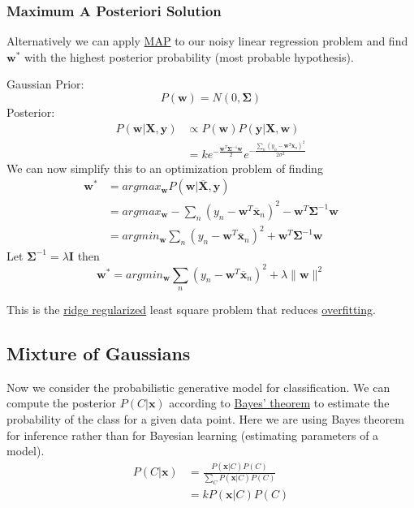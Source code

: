 \documentclass[12pt]{article}
\begin{document}
        \subsubsection{Maximum A Posteriori Solution}
            Alternatively we can apply \hyperref[sec:MAP]{MAP} to our noisy linear regression problem and find
            $\boldsymbol{w}^*$ with the highest posterior probability (most probable hypothesis).
            
            Gaussian Prior:
            $$ P(\boldsymbol{w}) = N(0, \boldsymbol{\Sigma}) $$ Posterior:
            \begin{align*}
                P(\boldsymbol{w} | \boldsymbol{X}, \boldsymbol{y}) &\propto P(\boldsymbol{w})P(\boldsymbol{y}|\boldsymbol{X}, \boldsymbol{w}) \\
                &= ke^{-\frac{\boldsymbol{w}^T\boldsymbol{\Sigma}^{-1}\boldsymbol{w}}{2}} e^{-\frac{\sum_n(y_n - \boldsymbol{w}^T\boldsymbol{x}_n)^2}{2\sigma^2}}
            \end{align*}
            We can now simplify this to an optimization problem of finding
            \begin{align*}
                \boldsymbol{w}^* &= argmax_{\boldsymbol{w}}P(\boldsymbol{w}|\overline{\boldsymbol{X}}, \boldsymbol{y}) \\
                &= argmax_{\boldsymbol{w}} - \sum_{n} (y_n - \boldsymbol{w}^T\overline{\boldsymbol{x}}_n)^2 - \boldsymbol{w}^T \boldsymbol{\Sigma}^{-1}\boldsymbol{w} \\
                &= argmin_{\boldsymbol{w}} \sum_{n} (y_n - \boldsymbol{w}^T \overline{\boldsymbol{x}}_n)^2 + \boldsymbol{w}^T \boldsymbol{\Sigma}^{-1}\boldsymbol{w}
            \end{align*}
            Let $\boldsymbol{\Sigma}^{-1} = \lambda \boldsymbol{I}$ then
            $$ \boldsymbol{w}^* = argmin_{\boldsymbol{w}} \sum_{n} (y_n - \boldsymbol{w}^T
            \overline{\boldsymbol{x}}_n)^2 + \lambda \|\boldsymbol{w}\|^2 $$

            This is the \hyperref[sec:RidgeReg]{ridge regularized} least square problem that reduces
            \hyperref[sec:Overfitting]{overfitting}.

    \subsection{Mixture of Gaussians} \label{sec:MixtureOfGaussian}
        Now we consider the probabilistic generative model \label{fact:GenerativeModel} for classification. We can
        compute the posterior $P(C|\boldsymbol{x})$ according to \hyperref[fact:Bayes]{Bayes' theorem} to estimate the
        probability of the class for a given data point. Here we are using Bayes theorem for inference rather than for
        Bayesian learning (estimating parameters of a model).
        \begin{align*}
            P(C|\boldsymbol{x}) &= \frac{P(\boldsymbol{x}|C)P(C)}{\sum_C P(\boldsymbol{x}|C)P(C)} \\
            &= k P(\boldsymbol{x}|C)P(C)
        \end{align*}
\end{document}
